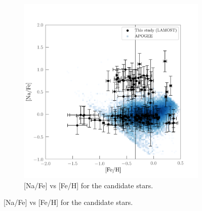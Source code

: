 \documentclass[a4paper,fleqn,usenatbib]{mnras}
\begin{document}
\begin{figure}
\begin{subfigure}{0.5\textwidth}
	\includegraphics[width=\columnwidth]{NavsFeh.png}
    \caption{[Na/Fe] vs [Fe/H] for the candidate stars.}
    \label{NavsFeh}
\end{subfigure}


\end{figure}
\end{document}
